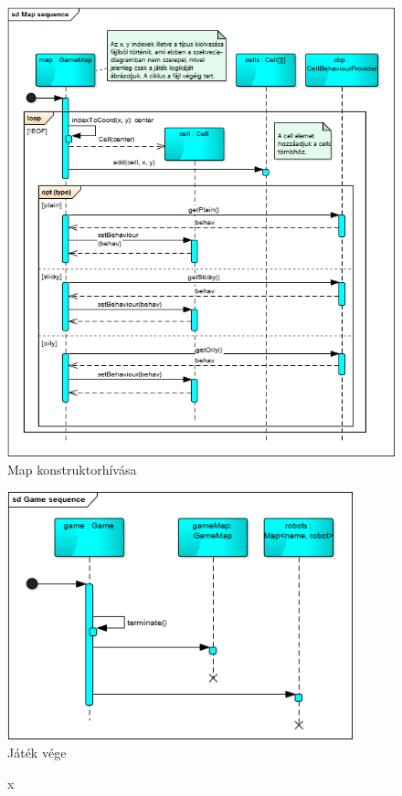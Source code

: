 \begin{figure}[!htbp]
	\begin{center}
		\includegraphics[width=\textwidth, center]{./chapters/chapter03/map.png}
		\caption{Map konstruktorhívása}
	\end{center}
\end{figure}

\begin{figure}[!htbp]
	\begin{center}
		\includegraphics[width=10cm, center]{./chapters/chapter03/endgame.png}
		\caption{Játék vége}
	\end{center}
\end{figure}



\clearpage




\begin{figure}[h]
\begin{center}
\caption{x}
\label{fig:example3}
\end{center}
\end{figure}

